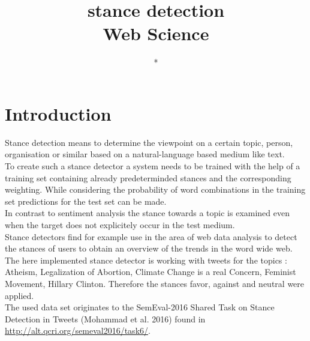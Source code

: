 \documentclass[a4paper,12pt,twoside]{article}
\title{stance detection\\ Web Science }
\author{*}
\begin{document}
\maketitle
\section{Introduction}
Stance detection means to determine the viewpoint on a certain topic, person, organisation or similar based on a natural-language based medium like text.\\ 
To create such a stance detector a system needs to be trained with the help of a training set containing already predeterminded stances and the corresponding weighting. While considering the probability of word combinations in the training set predictions for the test set can be made.\\
In contrast to sentiment analysis the stance towards a topic is examined even when the target does not explicitely occur in the test medium. \\
Stance detectors find for example use in the area of web data analysis to detect the stances of users to obtain an overview of the trends in the word wide web. \\
The here implemented stance detector is working with tweets for the topics : Atheism, Legalization of Abortion, Climate Change is a real Concern, Feminist Movement, Hillary Clinton. Therefore the stances favor, against and neutral were applied.\\
The used data set originates to the SemEval-2016 Shared Task on Stance Detection in Tweets
(Mohammad et al. 2016)  found in \url{http://alt.qcri.org/semeval2016/task6/}.
\end{document}
